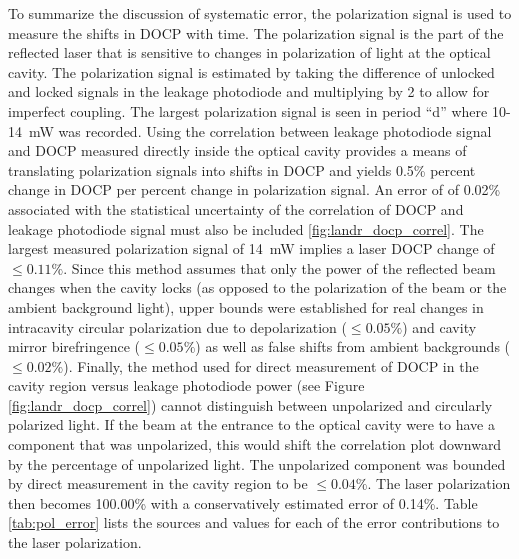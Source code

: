 To summarize the discussion of systematic error, the polarization signal is used to measure the shifts in DOCP with time. The polarization signal is the part of the reflected laser that is sensitive to changes in polarization of light at the optical cavity. The polarization signal is estimated by taking the difference of unlocked and locked signals in the leakage photodiode and multiplying by 2 to allow for imperfect coupling. The largest polarization signal is seen in period ``d'' where 10-14~mW was recorded. Using the correlation between leakage photodiode signal and DOCP measured directly inside the optical cavity provides a means of translating polarization signals into shifts in DOCP and yields 0.5\% percent change in DOCP per percent change in polarization signal. An error of of 0.02\% associated with the statistical uncertainty of the correlation of DOCP and leakage photodiode signal must also be included \ref{fig:landr_docp_correl}. The largest measured polarization signal of 14~mW implies a laser DOCP change of $\leq 0.11\%$. Since this method assumes that only the power of the reflected beam changes when the cavity locks (as opposed to the polarization of the beam or the ambient background light), upper bounds were established for real changes in intracavity circular polarization due to depolarization ($\leq 0.05\%$) and cavity mirror birefringence ($\leq 0.05\%$) as well as false shifts from ambient backgrounds ($\leq 0.02\%$). Finally, the method used for direct measurement of DOCP in the cavity region versus leakage photodiode power (see Figure \ref{fig:landr_docp_correl}) cannot distinguish between unpolarized and circularly polarized light. If the beam at the entrance to the optical cavity were to have a component that was unpolarized, this would shift the correlation plot downward by the percentage of unpolarized light. The unpolarized component was bounded by direct measurement in the cavity region to be $\leq 0.04\%$. The laser polarization then becomes 100.00\% with a conservatively estimated error of 0.14\%. Table \ref{tab:pol_error} lists the sources and values for each of the error contributions to the laser polarization.

